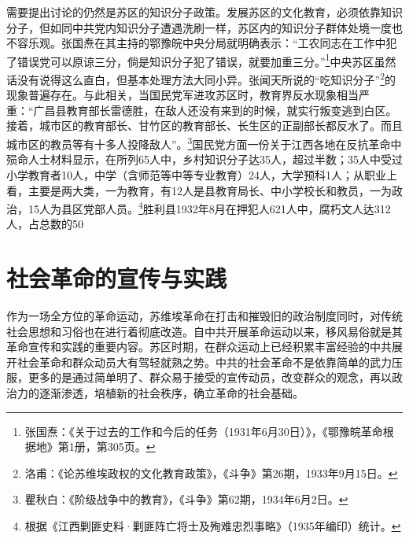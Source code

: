 需要提出讨论的仍然是苏区的知识分子政策。发展苏区的文化教育，必须依靠知识分子，但如同中共党内知识分子遭遇洗刷一样，苏区内的知识分子群体处境一度也不容乐观。张国焘在其主持的鄂豫皖中央分局就明确表示：“工农同志在工作中犯了错误党可以原谅三分，倘是知识分子犯了错误，就要加重三分。”\footnote{张国焘：《关于过去的工作和今后的任务（1931年6月30日）》，《鄂豫皖革命根据地》第1册，第305页。}中央苏区虽然话没有说得这么直白，但基本处理方法大同小异。张闻天所说的“吃知识分子”\footnote{洛甫：《论苏维埃政权的文化教育政策》，《斗争》第26期，1933年9月15日。}的现象普遍存在。与此相关，当国民党军进攻苏区时，教育界反水现象相当严重：“广昌县教育部长雷德胜，在敌人还没有来到的时候，就实行叛变逃到白区。接着，城市区的教育部长、甘竹区的教育部长、长生区的正副部长都反水了。而且城市区的教员等有十多人投降敌人”。\footnote{瞿秋白：《阶级战争中的教育》，《斗争》第62期，1934年6月2日。}国民党方面一份关于江西各地在反抗革命中殒命人士材料显示，在所列65人中，乡村知识分子达35人，超过半数；35人中受过小学教育者10人，中学（含师范等中等专业教育）24人，大学预科1人；从职业上看，主要是两大类，一为教育，有12人是县教育局长、中小学校长和教员，一为政治，15人为县区党部人员。\footnote{根据《江西剿匪史料·剿匪阵亡将士及殉难忠烈事略》（1935年编印）统计。}胜利县1932年8月在押犯人621人中，腐朽文人达312人，占总数的50%

\section{社会革命的宣传与实践}


作为一场全方位的革命运动，苏维埃革命在打击和摧毁旧的政治制度同时，对传统社会思想和习俗也在进行着彻底改造。自中共开展革命运动以来，移风易俗就是其革命宣传和实践的重要内容。苏区时期，在群众运动上已经积累丰富经验的中共展开社会革命和群众动员大有驾轻就熟之势。中共的社会革命不是依靠简单的武力压服，更多的是通过简单明了、群众易于接受的宣传动员，改变群众的观念，再以政治力的逐渐渗透，培植新的社会秩序，确立革命的社会基础。


